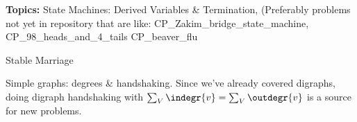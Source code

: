 \documentclass[handout]{mcs}
\begin{document}
\renewcommand{\reading}{Ch.~\bref{derived_var_subsec}, Derived
  Variables; Ch.~\bref{stablemarriagesec}, Stable Marriage;
  Ch.~\bref{degreessec}, Graph Isomorphism}


\begin{staffnotes}
\textbf{Topics:}
State Machines: Derived Variables \& Termination,
(Preferably problems not yet in repository that are like:
{CP\_Zakim\_bridge\_state\_machine},
{CP\_98\_heads\_and\_4\_tails}
{CP\_beaver\_flu}

Stable Marriage

Simple graphs: degrees \& handshaking.  Since we've already covered
digraphs, doing digraph handshaking with $\sum_V \indegr{v} = \sum_V
\outdegr{v}$ is a source for new problems.

\end{staffnotes}














\end{document}
